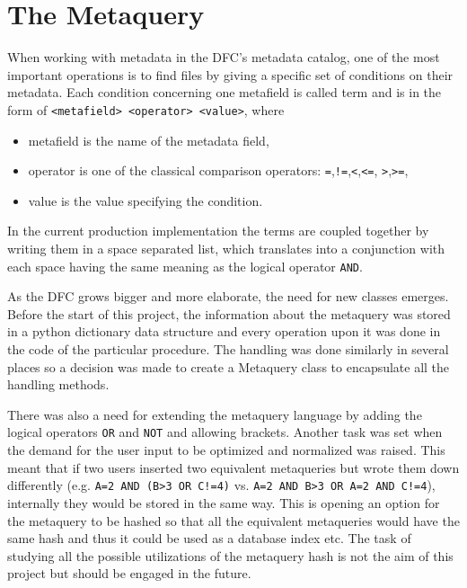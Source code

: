 \chapter{The Metaquery}
\label{chap:MQ}

When working with metadata in the DFC's metadata catalog, one of the most important operations is 
to find files by giving a specific set of conditions on their metadata. Each condition concerning
one metafield is called term and is in the form of \texttt{<metafield> <operator> <value>}, where
\begin{itemize}
\item metafield is the name of the metadata field,
\item operator is one of the classical comparison operators: \texttt{=},\texttt{!=},\texttt{<},\texttt{<=},
	\texttt{>},\texttt{>=}, 
\item value is the value specifying the condition.
\end{itemize}

In the current production implementation the terms are coupled 
together by writing them in a space separated list, which translates into a conjunction with
each space having the same meaning as the logical operator \texttt{AND}.

As the DFC grows bigger and more elaborate, the need for new classes emerges. Before the 
start of this project, the information about the metaquery was stored in a python dictionary
data structure and every operation upon it was done in the code of the particular procedure. 
The handling was done similarly in several places so a decision was made to create a 
Metaquery class to encapsulate all the handling methods. 

There was also a need for extending the metaquery language by adding the logical operators 
\texttt{OR} and \texttt{NOT} and allowing brackets. Another task was set when the demand for
the user input to be optimized and normalized was raised. This meant that if two users 
inserted two equivalent metaqueries but wrote them down 
differently (e.g. \texttt{A=2 AND (B>3 OR C!=4)} vs. \texttt{A=2 AND B>3 OR A=2 AND C!=4}), 
internally they would be stored in the same way. This is opening an option for the metaquery 
to be hashed so that all the equivalent metaqueries would have the same hash and thus it 
could be used as a database index etc. The task of studying all the possible utilizations of the 
metaquery hash is not the aim of this project but should be engaged in the future. 

